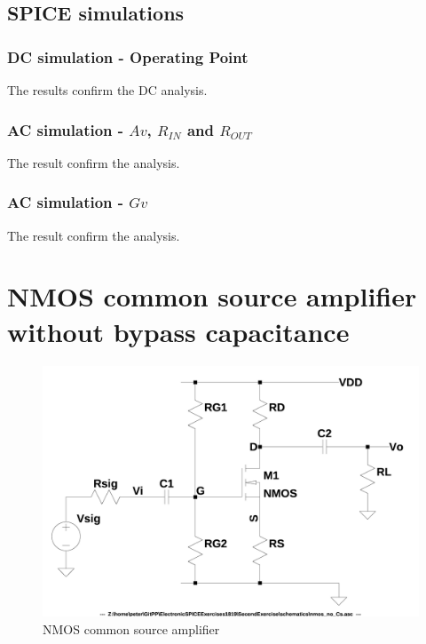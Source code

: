 \documentclass[10pt,a4paper]{book}
\begin{document}
\clearpage
\section{SPICE simulations}
\subsection{DC simulation - Operating Point}

The results confirm the DC analysis.


\subsection{AC simulation - $Av$, $R_{IN}$ and $R_{OUT}$}

The result confirm the analysis.


\subsection{AC simulation - $Gv$}

The result confirm the analysis.


\chapter{NMOS common source amplifier without bypass capacitance}
\begin{figure}[h]
  \centering
  \includegraphics[width=12cm]{schematics/nmos_no_Cs.jpg}
  \caption{NMOS common source amplifier}
  \label{nmos_no_Cs}
\end{figure}
\end{document}
